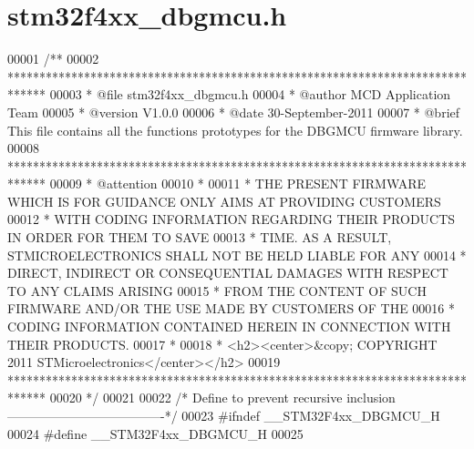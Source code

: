 \section{stm32f4xx\+\_\+dbgmcu.\+h}
\label{stm32f4xx__dbgmcu_8h_source}

\begin{DoxyCode}
00001 \textcolor{comment}{/**}
00002 \textcolor{comment}{  ******************************************************************************}
00003 \textcolor{comment}{  * @file    stm32f4xx\_dbgmcu.h}
00004 \textcolor{comment}{  * @author  MCD Application Team}
00005 \textcolor{comment}{  * @version V1.0.0}
00006 \textcolor{comment}{  * @date    30-September-2011}
00007 \textcolor{comment}{  * @brief   This file contains all the functions prototypes for the DBGMCU firmware library.}
00008 \textcolor{comment}{  ******************************************************************************}
00009 \textcolor{comment}{  * @attention}
00010 \textcolor{comment}{  *}
00011 \textcolor{comment}{  * THE PRESENT FIRMWARE WHICH IS FOR GUIDANCE ONLY AIMS AT PROVIDING CUSTOMERS}
00012 \textcolor{comment}{  * WITH CODING INFORMATION REGARDING THEIR PRODUCTS IN ORDER FOR THEM TO SAVE}
00013 \textcolor{comment}{  * TIME. AS A RESULT, STMICROELECTRONICS SHALL NOT BE HELD LIABLE FOR ANY}
00014 \textcolor{comment}{  * DIRECT, INDIRECT OR CONSEQUENTIAL DAMAGES WITH RESPECT TO ANY CLAIMS ARISING}
00015 \textcolor{comment}{  * FROM THE CONTENT OF SUCH FIRMWARE AND/OR THE USE MADE BY CUSTOMERS OF THE}
00016 \textcolor{comment}{  * CODING INFORMATION CONTAINED HEREIN IN CONNECTION WITH THEIR PRODUCTS.}
00017 \textcolor{comment}{  *}
00018 \textcolor{comment}{  * <h2><center>&copy; COPYRIGHT 2011 STMicroelectronics</center></h2>}
00019 \textcolor{comment}{  ******************************************************************************}
00020 \textcolor{comment}{  */}
00021 
00022 \textcolor{comment}{/* Define to prevent recursive inclusion -------------------------------------*/}
00023 \textcolor{preprocessor}{#}\textcolor{preprocessor}{ifndef} \textcolor{preprocessor}{\_\_STM32F4xx\_DBGMCU\_H}
00024 \textcolor{preprocessor}{#}\textcolor{preprocessor}{define} \textcolor{preprocessor}{\_\_STM32F4xx\_DBGMCU\_H}
00025 

\end{DoxyCode}
